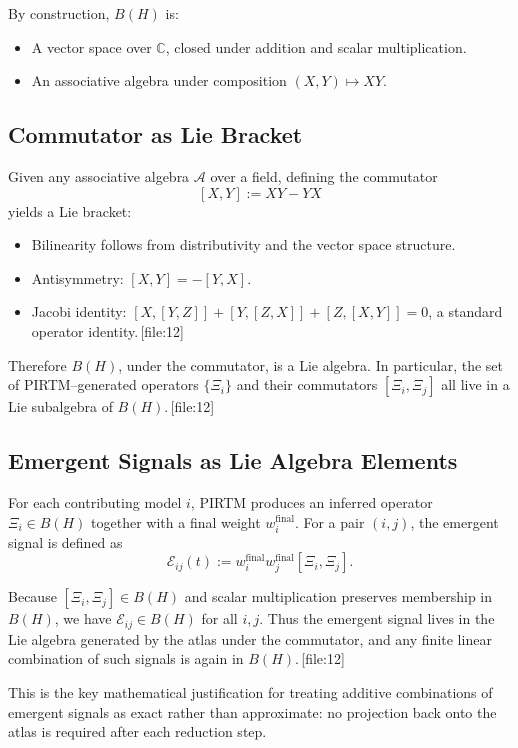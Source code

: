 \documentclass[11pt]{article}
\begin{document}
By construction, \(B(H)\) is:
\begin{itemize}[leftmargin=*]
  \item A vector space over \(\mathbb{C}\), closed under addition and scalar
  multiplication.
  \item An associative algebra under composition \((X,Y) \mapsto XY\).
\end{itemize}

\subsection{Commutator as Lie Bracket}

Given any associative algebra \(\mathcal{A}\) over a field, defining the
commutator
\[
  [X,Y] := XY - YX
\]
yields a Lie bracket:

\begin{itemize}[leftmargin=*]
  \item Bilinearity follows from distributivity and the vector space
  structure.
  \item Antisymmetry: \([X,Y] = -[Y,X]\).
  \item Jacobi identity: \([X,[Y,Z]] + [Y,[Z,X]] + [Z,[X,Y]] = 0\),
  a standard operator identity.\,[file:12]
\end{itemize}

Therefore \(B(H)\), under the commutator, is a Lie algebra. In particular, the
set of PIRTM--generated operators \(\{\Xi_i\}\) and their commutators
\([\Xi_i, \Xi_j]\) all live in a Lie subalgebra of \(B(H)\).\,[file:12]

\subsection{Emergent Signals as Lie Algebra Elements}

For each contributing model \(i\), PIRTM produces an inferred operator
\(\Xi_i \in B(H)\) together with a final weight \(w_i^{\text{final}}\). For a
pair \((i,j)\), the emergent signal is defined as
\[
  \mathcal{E}_{ij}(t) := w_i^{\text{final}} w_j^{\text{final}} [\Xi_i, \Xi_j].
\]

Because \([\Xi_i,\Xi_j] \in B(H)\) and scalar multiplication preserves
membership in \(B(H)\), we have \(\mathcal{E}_{ij} \in B(H)\) for all \(i,j\).
Thus the emergent signal lives in the Lie algebra generated by the atlas
under the commutator, and any finite linear combination of such signals is
again in \(B(H)\).\,[file:12]

This is the key mathematical justification for treating additive combinations
of emergent signals as exact rather than approximate: no projection back onto
the atlas is required after each reduction step.
\end{document}
